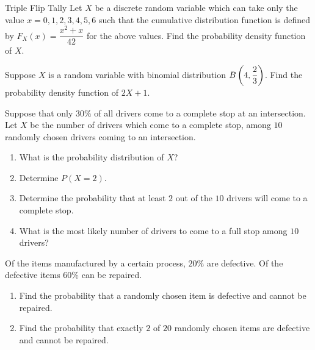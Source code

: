 \documentclass[11pt]{article}
\theoremstyle{mystyle}
\begin{document}
\begin{psproblem}{Triple Flip Tally}{}
    Let $X$ be a discrete random variable which can take only the value $x = 0, 1, 2, 3, 4, 5, 6$ such that the cumulative
    distribution function is defined by $F_X(x) = \dfrac{x^2 + x}{42}$ for the above values. Find the probability density function of $X$.
\end{psproblem}
\begin{psproblem}{}{}
    Suppose $X$ is a random variable with binomial distribution $B \displaystyle \left( 4, \dfrac{2}{3} \displaystyle \right)$. Find the probability density function of
    $2X + 1$.
\end{psproblem}
\begin{psproblem}{}{}
    Suppose that only $30\%$ of all drivers come to a complete stop at an intersection. Let $X$ be the number of drivers
    which come to a complete stop, among $10$ randomly chosen drivers coming to an intersection.
    \begin{enumerate}[label=\alph*.]
        \item What is the probability distribution of $X$?
        \item Determine $P(X = 2)$.
        \item Determine the probability that at least $2$ out of the $10$ drivers will come to a complete stop.
        \item What is the most likely number of drivers to come to a full stop among $10$ drivers?
    \end{enumerate}
\end{psproblem}
\begin{psproblem}{}{}
    Of the items manufactured by a certain process, $20\%$ are defective. Of the defective items $60\%$ can be repaired.
    \begin{enumerate}[label=\alph*.]
        \item Find the probability that a randomly chosen item is defective and cannot be repaired.
        \item Find the probability that exactly $2$ of $20$ randomly chosen items are defective and cannot be repaired.
    \end{enumerate}
\end{psproblem}
\end{document}
